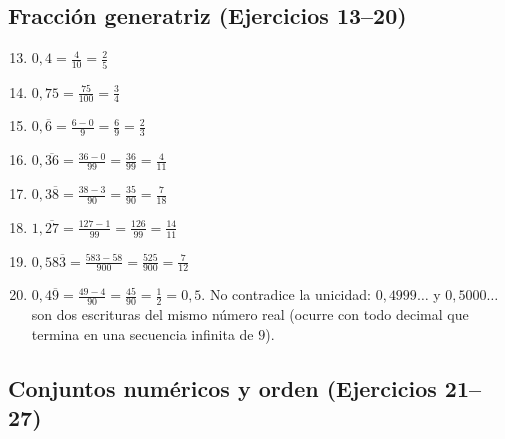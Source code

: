 \documentclass[12pt, letterpaper]{article}
\begin{document}
  \subsection*{Fracción generatriz (Ejercicios 13--20)}

  \begin{enumerate}[leftmargin=*, label=\textbf{\arabic*.}]
    \setcounter{enumi}{12}
    \item $0{,}4 = \frac{4}{10} = \frac{2}{5}$

    \item $0{,}75 = \frac{75}{100} = \frac{3}{4}$

    \item $0{,}\overline{6} = \frac{6-0}{9} = \frac{6}{9} = \frac{2}{3}$

    \item $0{,}\overline{36} = \frac{36-0}{99} = \frac{36}{99} = \frac{4}{11}$

    \item $0{,}3\overline{8} = \frac{38-3}{90} = \frac{35}{90} = \frac{7}{18}$

    \item $1{,}\overline{27} = \frac{127-1}{99} = \frac{126}{99} = \frac{14}{11}$

    \item $0{,}58\overline{3} = \frac{583-58}{900} = \frac{525}{900} = \frac{7}{12}$

    \item $0{,}4\overline{9} = \frac{49-4}{90} = \frac{45}{90} = \frac{1}{2} = 0{,}5$. No contradice la unicidad: $0{,}4999\ldots$ y $0{,}5000\ldots$ son dos escrituras del mismo número real (ocurre con todo decimal que termina en una secuencia infinita de $9$).
  \end{enumerate}

  \subsection*{Conjuntos numéricos y orden (Ejercicios 21--27)}
\end{document}
